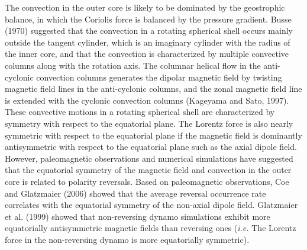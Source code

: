 The convection in the outer core is likely to be dominated by the geostrophic balance, in which the Coriolis force is balanced by the pressure gradient.
Busse (1970) 
suggested that the convection in a rotating spherical shell occurs mainly outside the tangent cylinder, which is an imaginary cylinder with the radius of the inner core, and that the convection is characterized by multiple convective columns along with the rotation axis. 
The columnar helical flow in the anti-cyclonic convection columns generates the dipolar magnetic field by twisting magnetic field lines in the anti-cyclonic columns, and the zonal magnetic field line is extended with the cyclonic convection columns (Kageyama and Sato, 1997). %
These convective motions in a rotating spherical shell are characterized by symmetry with respect to the equatorial plane.
The Lorentz force is also nearly symmetric with respect to the equatorial plane if the magnetic field is dominantly antisymmetric with respect to the equatorial plane such as the axial dipole field.
However, paleomagnetic observations and numerical simulations have suggested that the equatorial symmetry of the magnetic field and convection in the outer core is related to polarity reversals.
%
Based on paleomagnetic observations, Coe and Glatzmaier (2006) showed that the average reversal {\color{red} occurrence} rate correlates with the equatorial symmetry of the non-axial dipole field.
Glatzmaier et al. (1999) showed that non-reversing {\color{red} dynamo} simulations exhibit more equatorially antisymmetric magnetic fields than reversing ones {\color{red} ({\it i.e.} The Lorentz force in the non-reversing dynamo is more equatorially symmetric)}.
